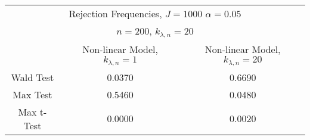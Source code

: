  \begin{table}[H] 
 \small 
 \centering 
\begin{tabular}{|c|c|c|} 
\multicolumn{3}{c}{ Rejection Frequencies, $J=1000$ $\alpha = 0.05$ } \\ 
\multicolumn{3}{c}{ $n=200$, $k_{\lambda,n}=20$ } \\ 
 \hline 
 & Non-linear Model, $k_{\lambda,n}=1$ & Non-linear Model, $k_{\lambda,n}=20$   \\ 
 \hline 
 Wald Test &  0.0370 &  0.6690 \\ 
 Max Test &  0.5460 &  0.0480 \\ 
 Max t-Test &  0.0000 &  0.0020 \\ 
 \hline 
\end{tabular}
 \end{table}
